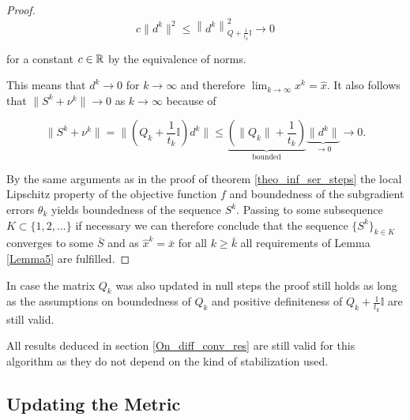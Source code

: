 \begin{proof}
\begin{equation*}
	 c\|d^k\|^2 \leq \left\lVert d^k\right\rVert^2_{Q+\frac{1}{t_k}\mathbb{I}} \to 0
\end{equation*}

for a constant \(c \in \mathbb{R} \) by the equivalence of norms.

This means that \(d^k \to 0\) for \(k \to \infty\) and therefore \(\lim_{k \to \infty}x^k = \hat{x}\). It also follows that \(\|S^k+\nu^k\| \to 0\) as \(k \to \infty\) because of 

\[ \|S^{{k}} + \nu^{{k}} \| = \|\left(Q_{k}+\frac{1}{t_{{k}}}\mathbb{I}\right)d^{{k}} \| \leq \underbrace{\left(\|Q_{{k}}\|+\frac{1}{t_{{k}}}\right)}_{\text{bounded}}\underbrace{\|d^{k}\|}_{\to 0} \to 0.\]

By the same arguments as in the proof of theorem \ref{theo_inf_ser_steps} the local Lipschitz property of the objective function \(f\) and boundedness of the subgradient errors \(\theta_k\) yields boundedness of the sequence \(S^k\). Passing to some subsequence \(K \subset \{1,2,...\}\) if necessary we can therefore conclude that the sequence \(\{S^k\}_{k\in K}\) converges to some \(\bar{S}\) and as \(\hat{x}^k = \bar{x}\) for all \(k \geq \bar{k}\) all requirements of Lemma \ref{Lemma5} are fulfilled.

\end{proof}

\begin{remark}
	In case the matrix \(Q_k\) was also updated in null steps the proof still holds as long as the assumptions on boundedness of \(Q_k\) and positive definiteness of \(Q_k+\frac{1}{t_k}\mathbb{I}\) are still valid.
\end{remark}

\begin{remark}
	All results deduced in section \ref{On_diff_conv_res} are still valid for this algorithm as they do not depend on the kind of stabilization used.
\end{remark}

\subsection{Updating the Metric}
\label{sec_upd_Q}


